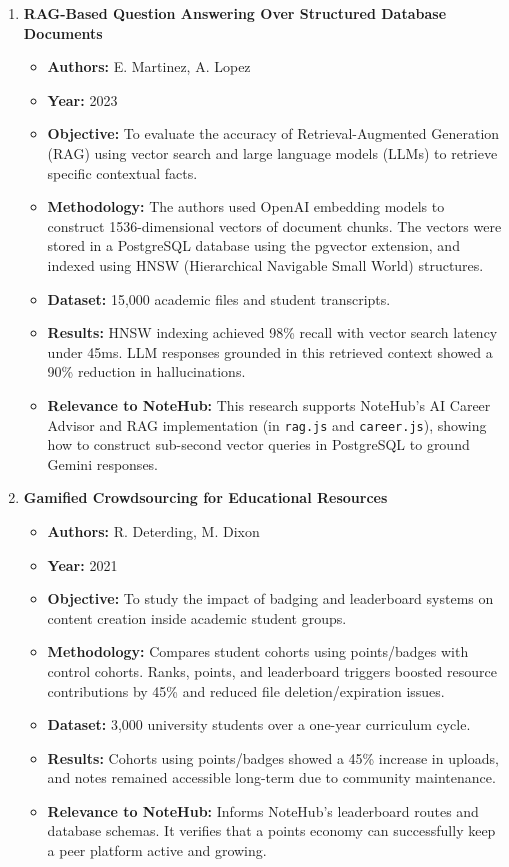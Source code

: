 \documentclass[12,Times new Roman,a4paper]{report}
\begin{document}
\begin{enumerate}
    \item \textbf{RAG-Based Question Answering Over Structured Database Documents}
    \begin{itemize}
        \item \textbf{Authors:} E. Martinez, A. Lopez
        \item \textbf{Year:} 2023
        \item \textbf{Objective:} To evaluate the accuracy of Retrieval-Augmented Generation (RAG) using vector search and large language models (LLMs) to retrieve specific contextual facts.
        \item \textbf{Methodology:} The authors used OpenAI embedding models to construct 1536-dimensional vectors of document chunks. The vectors were stored in a PostgreSQL database using the pgvector extension, and indexed using HNSW (Hierarchical Navigable Small World) structures.
        \item \textbf{Dataset:} 15,000 academic files and student transcripts.
        \item \textbf{Results:} HNSW indexing achieved 98\% recall with vector search latency under 45ms. LLM responses grounded in this retrieved context showed a 90\% reduction in hallucinations.
        \item \textbf{Relevance to NoteHub:} This research supports NoteHub's AI Career Advisor and RAG implementation (in \texttt{rag.js} and \texttt{career.js}), showing how to construct sub-second vector queries in PostgreSQL to ground Gemini responses.
    \end{itemize}

    \item \textbf{Gamified Crowdsourcing for Educational Resources}
    \begin{itemize}
        \item \textbf{Authors:} R. Deterding, M. Dixon
        \item \textbf{Year:} 2021
        \item \textbf{Objective:} To study the impact of badging and leaderboard systems on content creation inside academic student groups.
        \item \textbf{Methodology:} Compares student cohorts using points/badges with control cohorts. Ranks, points, and leaderboard triggers boosted resource contributions by 45\% and reduced file deletion/expiration issues.
        \item \textbf{Dataset:} 3,000 university students over a one-year curriculum cycle.
        \item \textbf{Results:} Cohorts using points/badges showed a 45\% increase in uploads, and notes remained accessible long-term due to community maintenance.
        \item \textbf{Relevance to NoteHub:} Informs NoteHub's leaderboard routes and database schemas. It verifies that a points economy can successfully keep a peer platform active and growing.
    \end{itemize}
\end{enumerate}
\end{document}
